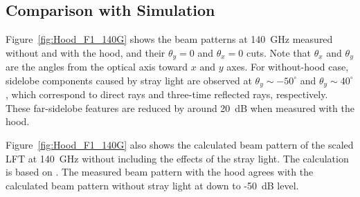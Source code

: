 \documentclass[journal]{IEEEtran}
\newcommand{\red}[1]{\textcolor{red}{#1}}
\begin{document}
\subsection{Comparison with Simulation}
%
\par
Figure~\ref{fig:Hood_F1_140G} shows the beam patterns at 140~GHz measured without and with the hood, and their $\theta_y = 0$ and $\theta_x = 0$ cuts. Note that $\theta_x$ and $\theta_y$ are the angles from the optical axis toward $x$ and $y$ axes. For without-hood case, sidelobe components caused by stray light are observed at $\theta_y \sim -50^\circ$ and $\theta_y \sim 40^\circ$, which correspond to direct rays and three-time reflected rays, respectively. These far-sidelobe features are reduced by around 20~dB when measured with the hood.
\par
Figure~\ref{fig:Hood_F1_140G} also shows the calculated beam pattern of the scaled LFT at 140~GHz without including the effects of the stray light. The calculation is based on \cite[Eq. 1.22]{Kitsuregawa1990}. The measured beam pattern with the hood agrees with the calculated beam pattern without stray light at down to -50~dB level. 
%
\end{document}
